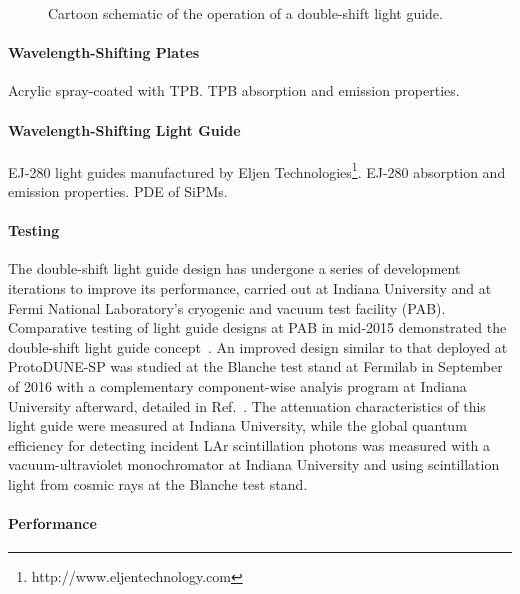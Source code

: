 \begin{figure}[ht]
  \begin{center}
  \caption{Cartoon schematic of the operation of a double-shift light guide.}\label{fig:DoubleShiftLG-Cartoon}
  \end{center}
\end{figure}

\paragraph*{Wavelength-Shifting Plates}

Acrylic spray-coated with TPB. TPB absorption and emission properties.

\paragraph*{Wavelength-Shifting Light Guide}

EJ-280 light guides manufactured by Eljen Technologies\footnote{http://www.eljentechnology.com}. 
EJ-280 absorption and emission properties. PDE of SiPMs.

\paragraph*{Testing}

The double-shift light guide design has undergone a series of development 
iterations to improve its performance, carried out at Indiana University and at 
Fermi National Laboratory's cryogenic and vacuum test facility (PAB). 
Comparative testing of light guide designs at PAB in mid-2015 demonstrated 
the double-shift light guide concept~\cite{bib:JINST-11-C05019}.
 An improved design similar to that deployed at ProtoDUNE-SP was studied at 
the Blanche test stand at Fermilab in September of 2016 with a complementary 
component-wise analyis program at Indiana University afterward, detailed in 
Ref.~\cite{bib:DoubleShiftLG-NIM-171113}. The attenuation characteristics of 
this light guide were measured at Indiana University, while the global quantum 
efficiency for detecting incident LAr scintillation photons was measured with 
a vacuum-ultraviolet monochromator at Indiana University and using 
scintillation light from cosmic rays at the Blanche test stand.

\paragraph*{Performance}

